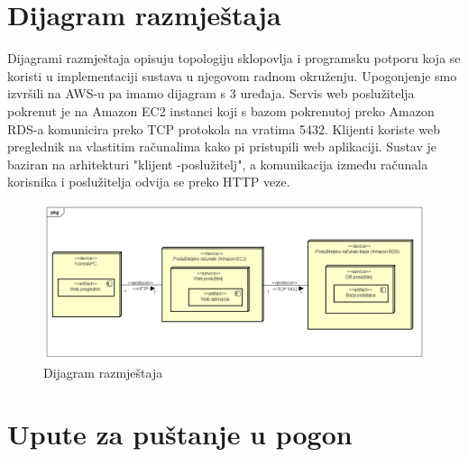 \eject


\section{Dijagram razmještaja}

Dijagrami razmještaja opisuju topologiju sklopovlja i programsku potporu koja se koristi u implementaciji sustava u njegovom radnom okruženju. Upogonjenje smo izvršili na AWS-u pa imamo dijagram s 3 uređaja. Servis web poslužitelja pokrenut je na Amazon EC2 instanci koji s bazom pokrenutoj preko Amazon RDS-a komunicira preko TCP protokola na vratima 5432. Klijenti koriste web preglednik na vlastitim računalima kako pi pristupili web aplikaciji. Sustav je baziran na arhitekturi "klijent -poslužitelj", a komunikacija između računala korisnika i poslužitelja odvija se preko HTTP veze.
\begin{figure}[H]
	\includegraphics[scale=0.45]{slike/DijagramRazmjestaja.PNG} %
	\centering
	\caption{Dijagram razmještaja}
	\label{fig:promjene}
\end{figure}
\eject

\section{Upute za puštanje u pogon}

